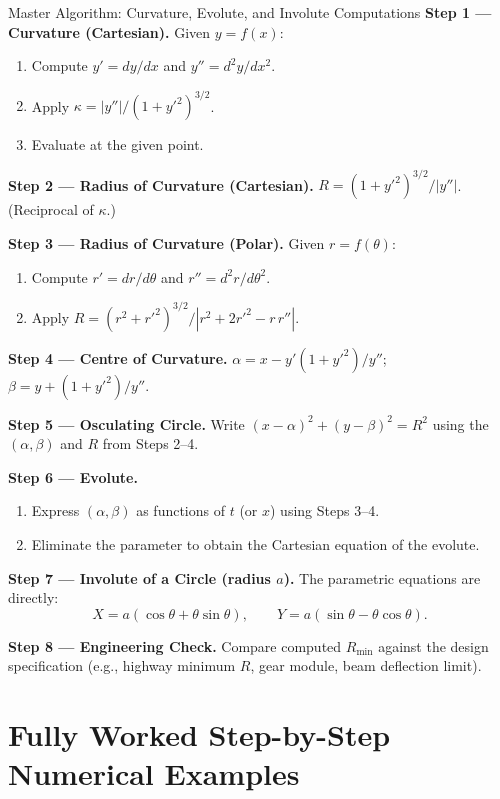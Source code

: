 \documentclass[12pt,a4paper]{article}
\begin{document}
\begin{learnbox}{Master Algorithm: Curvature, Evolute, and Involute Computations}
\textbf{Step 1 --- Curvature (Cartesian).}
Given $y = f(x)$:
\begin{enumerate}[nosep]
  \item Compute $y' = dy/dx$ and $y'' = d^{2}y/dx^{2}$.
  \item Apply $\kappa = |y''|/(1+y'^{2})^{3/2}$.
  \item Evaluate at the given point.
\end{enumerate}

\textbf{Step 2 --- Radius of Curvature (Cartesian).}
$R = (1+y'^{2})^{3/2}/|y''|$. (Reciprocal of $\kappa$.)

\textbf{Step 3 --- Radius of Curvature (Polar).}
Given $r = f(\theta)$:
\begin{enumerate}[nosep]
  \item Compute $r' = dr/d\theta$ and $r'' = d^{2}r/d\theta^{2}$.
  \item Apply $R = (r^{2}+r'^{2})^{3/2}/|r^{2}+2r'^{2}-r\,r''|$.
\end{enumerate}

\textbf{Step 4 --- Centre of Curvature.}
$\alpha = x - y'(1+y'^{2})/y''$;\quad $\beta = y + (1+y'^{2})/y''$.

\textbf{Step 5 --- Osculating Circle.}
Write $(x-\alpha)^{2}+(y-\beta)^{2} = R^{2}$ using the $(\alpha,\beta)$ and $R$ from Steps 2--4.

\textbf{Step 6 --- Evolute.}
\begin{enumerate}[nosep]
  \item Express $(\alpha, \beta)$ as functions of $t$ (or $x$) using Steps 3--4.
  \item Eliminate the parameter to obtain the Cartesian equation of the evolute.
\end{enumerate}

\textbf{Step 7 --- Involute of a Circle (radius $a$).}
The parametric equations are directly:
\[
  X = a(\cos\theta + \theta\sin\theta), \qquad Y = a(\sin\theta - \theta\cos\theta).
\]

\textbf{Step 8 --- Engineering Check.}
Compare computed $R_{\min}$ against the design specification (e.g., highway minimum $R$, gear module, beam deflection limit).
\end{learnbox}

\section{Fully Worked Step-by-Step Numerical Examples}
\end{document}
